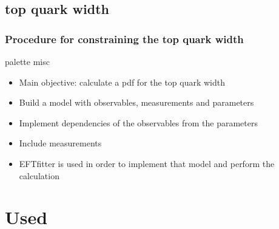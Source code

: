 \documentclass{beamer}
\begin{document}
\subsection{top quark width}
\begin{frame}
	\frametitle{Procedure for constraining the top quark width} \vspace{-3mm}
	\begin{beamercolorbox}[rounded=true,shadow=true]{palette misc}
		\begin{itemize}
			\item Main objective: calculate a pdf for the top quark width
			\item Build a model with observables, measurements and parameters
			\item Implement dependencies of the observables from the parameters
			\item Include measurements
			\item EFTfitter is used in order to implement that model and perform the calculation
		\end{itemize}\vspace{2mm}
	\end{beamercolorbox}
\end{frame}

\section{Used}
\end{document}
